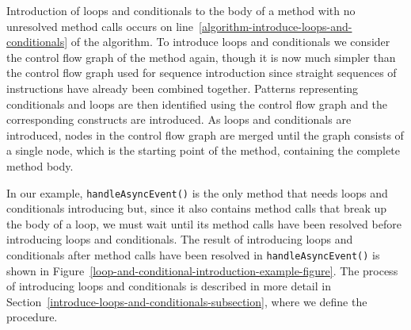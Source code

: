 Introduction of loops and conditionals to the body of a method with no
unresolved method calls occurs on
line~\ref{algorithm-introduce-loops-and-conditionals} of the
algorithm.
To introduce loops and conditionals we consider the control flow graph
of the method again, though it is now much simpler than the control
flow graph used for sequence introduction since straight sequences of
instructions have already been combined together.
Patterns representing conditionals and loops are then identified using
the control flow graph and the corresponding constructs are
introduced.
As loops and conditionals are introduced, nodes in the control flow
graph are merged until the graph consists of a single node, which is
the starting point of the method, containing the complete method body.

In our example, \texttt{handleAsyncEvent()} is the only method that
needs loops and conditionals introducing but, since it also contains
method calls that break up the body of a loop, we must wait until its
method calls have been resolved before introducing loops and
conditionals.
The result of introducing loops and conditionals after method calls
have been resolved in \texttt{handleAsyncEvent()} is shown in
Figure~\ref{loop-and-conditional-introduction-example-figure}.
The process of introducing loops and conditionals is described in more
detail in Section~\ref{introduce-loops-and-conditionals-subsection},
where we define the  procedure.
